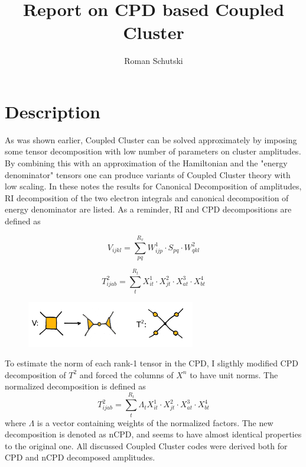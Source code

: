 \documentclass[a4paper,10pt]{article}
\title{Report on CPD based Coupled Cluster}
\author{Roman Schutski}
\begin{document}
\maketitle

\section{Description}

As was shown earlier, Coupled Cluster can be solved approximately by imposing 
some tensor decomposition with low number of parameters on cluster amplitudes. By combining 
this with an approximation of the Hamiltonian and the "energy denominator" tensors one can 
produce variants of Coupled Cluster theory with low scaling. 
In these notes the results for Canonical Decomposition of amplitudes, RI decomposition
of the two electron integrals and canonical decomposition of energy denominator are 
listed. 
As a reminder, RI and CPD decompositions are defined as

\begin{equation}
V_{ijkl} = \sum_{pq}^{R_{v}} W^{1}_{ijp} \cdot S_{pq} \cdot W^{2}_{qkl}  
\end{equation}

\begin{equation}
T^{2}_{ijab} = \sum_{t}^{R_{t}} X^{1}_{it} \cdot X^{2}_{jt} \cdot X^{3}_{at} \cdot X^{4}_{bt}  
\end{equation}

\begin{figure}[!ht]
\centering
\includegraphics[height=20mm]{graphics/cpd_cc.png}
\end{figure}
 
To estimate the norm of each rank-1 tensor in the CPD,
I sligthly modified CPD decomposition of $T^{2}$ and forced the columns of
$X^{n}$ to have unit norms. The normalized decomposition is defined as
\begin{equation}
T^{2}_{ijab} = \sum_{t}^{R_{t}} \Lambda_{t} X^{1}_{it} \cdot X^{2}_{jt} \cdot X^{3}_{at} \cdot X^{4}_{bt}  
\end{equation}
where $\Lambda$ is a vector containing weights of the normalized factors. The new decomposition 
is denoted as nCPD, and seems to have almost identical properties to the original one.
All discussed Coupled Cluster codes were derived both for CPD and nCPD decomposed amplitudes.
\end{document}
